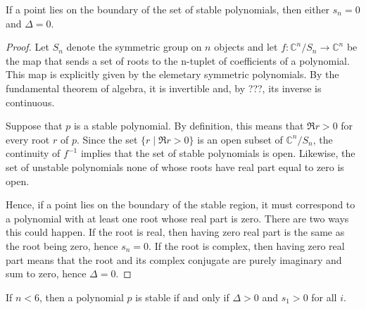 \begin{lemma}
If a point lies on the boundary of the set of stable polynomials, then
either $s_n = 0$ and $\Delta = 0$.
\end{lemma}

\begin{proof}
Let $S_n$ denote the symmetric group on $n$ objects and let $f \colon
\mathbb{C}^n/S_n \to \mathbb{C}^n$ be the map that sends a set of roots
to the n-tuplet of coefficients of a polynomial.  This map is explicitly
given by the elemetary symmetric polynomials.  By the fundamental theorem
of algebra, it is invertible and, by ???, its inverse is continuous.

Suppose that $p$ is a stable polynomial.  By definition, this means that
$\Re r > 0$ for every root $r$ of $p$.  Since the set $\{r \mid \Re r > 0\}$
is an open subset of $\mathbb{C}^n/S_n$, the continuity of $f^{-1}$ implies
that the set of stable polynomials is open.  Likewise, the set of unstable
polynomials none of whose roots have real part equal to zero is open.

Hence, if a point lies on the boundary of the stable region, it must
correspond to a polynomial with at least one root whose real part is zero.
There are two ways this could happen.  If the root is real, then having
zero real part is the same as the root being zero, hence $s_n = 0$.  If
the root is complex, then having zero real part means that the root and
its complex conjugate are purely imaginary and sum to zero, hence $\Delta = 0$.
\end{proof}

\begin{lemma}
If $n < 6$, then a polynomial $p$ is stable if and only
if $\Delta > 0$ and $s_1 > 0$ for all $i$.
\end{lemma}

